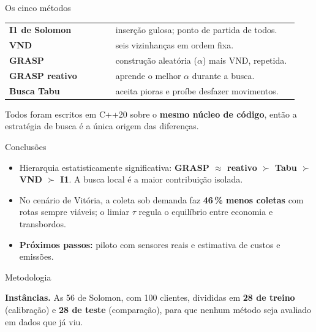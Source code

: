 \documentclass[portrait,a0paper,fontscale=0.285]{baposter}
\begin{document}
\begin{poster}
\begin{posterbox}[name=metodos,column=0,below=vrptw]{Os cinco métodos}
\begin{tabular}{@{}p{0.36\linewidth}@{\ }p{0.62\linewidth}@{}}
\textbf{I1 de Solomon} & inserção gulosa; ponto de partida de todos.\\
\textbf{VND} & seis vizinhanças em ordem fixa.\\
\textbf{GRASP} & construção aleatória ($\alpha$) mais VND, repetida.\\
\textbf{GRASP reativo} & aprende o melhor $\alpha$ durante a busca.\\
\textbf{Busca Tabu} & aceita pioras e proíbe desfazer movimentos.\\
\end{tabular}

\vspace{0.4em}
Todos foram escritos em C++20 sobre o \textbf{mesmo núcleo de código}, então a
estratégia de busca é a única origem das diferenças.
\end{posterbox}

\begin{posterbox}[name=conclusao,column=0,below=metodos,above=agradecimento]{Conclusões}
\begin{itemize}
  \item Hierarquia estatisticamente significativa: \textbf{GRASP $\approx$
        reativo $\succ$ Tabu $\succ$ VND $\succ$ I1}. A busca local é a maior
        contribuição isolada.
  \item No cenário de Vitória, a coleta sob demanda faz \textbf{46\,\% menos
        coletas} com rotas sempre viáveis; o limiar $\tau$ regula o
        equilíbrio entre economia e transbordos.
  \item \textbf{Próximos passos:} piloto com sensores reais e estimativa de
        custos e emissões.
\end{itemize}
\end{posterbox}

\begin{posterbox}[name=metodologia,column=1,below=resumo,span=2]{Metodologia}
\begin{minipage}[t]{0.47\textwidth}
\vspace{0pt}
\textbf{Instâncias.} As 56 de Solomon, com 100 clientes, divididas em
\textbf{28 de treino} (calibração) e \textbf{28 de teste} (comparação), para que
nenhum método seja avaliado em dados que já viu.


\end{minipage}
\end{posterbox}
\end{poster}
\end{document}
